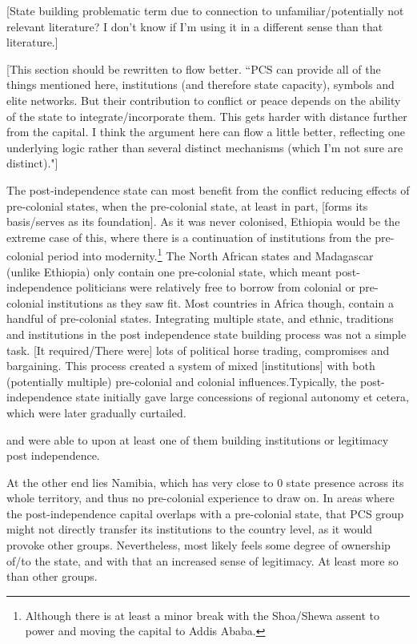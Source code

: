 \documentclass[12pt]{article}
\begin{document}
[State building problematic term due to connection to unfamiliar/potentially not
relevant literature? I don't know if I'm using it in a different sense than that
literature.]

[This section should be rewritten to flow better. ``PCS can provide all of the
things mentioned here, institutions (and therefore state capacity), symbols and
elite networks. But their contribution to conflict or peace depends on the
ability of the state to integrate/incorporate them. This gets harder with
distance further from the capital. I think the argument here can flow a little
better, reflecting one underlying logic rather than several distinct mechanisms
(which I'm not sure are distinct)."]

The post-independence state can most benefit from the conflict reducing effects
of pre-colonial states, when the pre-colonial state, at least in part, [forms
its basis/serves as its foundation]. As it was never colonised, Ethiopia would
be the extreme case of this, where there is a continuation of institutions from
the pre-colonial period into modernity.\footnote{Although there is at least a
minor break with the Shoa/Shewa assent to power and moving the capital to Addis
Ababa.} The North African states and Madagascar (unlike Ethiopia) only contain
one pre-colonial state, which meant post-independence politicians were
relatively free to borrow from colonial or pre-colonial institutions as they saw
fit. Most countries in Africa though, contain a handful of pre-colonial states.
Integrating multiple state, and ethnic, traditions and institutions in the post
independence state building process was not a simple task. [It required/There
were] lots of political horse trading, compromises and bargaining. This process
created a system of mixed [institutions] with both (potentially multiple)
pre-colonial and colonial influences.Typically, the post-independence state
initially gave large concessions of regional autonomy et cetera, which were
later gradually curtailed.

and were able to
upon at least one of them building institutions or legitimacy post independence.
 
At the other end lies Namibia, which has very close to 0 state presence
across its whole territory, and thus no pre-colonial experience to draw on. 
In areas where the post-independence
capital overlaps with a pre-colonial state, that PCS group might not directly
transfer its institutions to the country level, as it would provoke other
groups. Nevertheless, most likely feels some degree of ownership of/to the
state, and with that an increased sense of legitimacy. At least more so than
other groups. 
\end{document}

